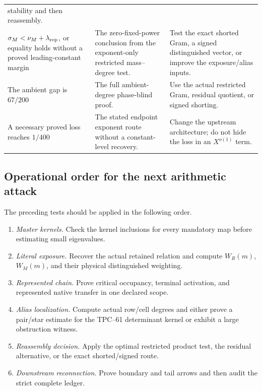 \begin{center}
\begin{tabular}{>{\raggedright\arraybackslash}p{}
                >{\raggedright\arraybackslash}p{}
                >{\raggedright\arraybackslash}p{}}
  stability and then reassembly.\\
\addlinespace
\(\sigma_M<\nu_M+\lambda_{\rm rep}\), or equality holds without a proved
leading-constant margin
& The zero-fixed-power conclusion from the exponent-only restricted
  mass--degree test.
& Test the exact shorted Gram, a signed distinguished vector, or improve the
  exposure/alias inputs.\\
\addlinespace
The ambient gap is \(67/200\)
& The full ambient-degree phase-blind proof.
& Use the actual restricted Gram, residual quotient, or signed shorting.\\
\addlinespace
A necessary proved loss reaches \(1/400\)
& The stated endpoint exponent route without a constant-level recovery.
& Change the upstream architecture; do not hide the loss in an
  \(X^{o(1)}\) term.\\
\bottomrule
\end{tabular}
\end{center}

\subsection{Operational order for the next arithmetic attack}

The preceding tests should be applied in the following order.
\begin{enumerate}[label=\textbf{Door \Alph*.},leftmargin=3.8em]
 \item \emph{Master kernels.}  Check the kernel inclusions for every
       mandatory map before estimating small eigenvalues.
 \item \emph{Literal exposure.}  Recover the actual retained relation and
       compute \(W_R(m)\), \(W_M(m)\), and their physical distinguished
       weighting.
 \item \emph{Represented chain.}  Prove critical occupancy, terminal
       activation, and represented native transfer in one declared scope.
 \item \emph{Alias localization.}  Compute actual row/cell degrees and
       either prove a pair/star estimate for the TPC--61 determinant kernel
       or exhibit a large obstruction witness.
 \item \emph{Reassembly decision.}  Apply the optimal restricted product
       test, the residual alternative, or the exact shorted/signed route.
 \item \emph{Downstream reconnection.}  Prove boundary and tail arrows and
       then audit the strict complete ledger.
\end{enumerate}

